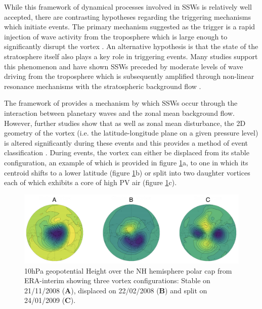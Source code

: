 While this framework of dynamical processes involved in SSWs is relatively well accepted, there are contrasting hypotheses regarding the triggering mechanisms which initiate events. The primary mechanism suggested as the trigger is a rapid injection of wave activity from the troposphere which is large enough to significantly disrupt the vortex \citep{matsunoDynamical1971b, limpasuvanLife2004b, manneyAura2009b, nishiiModulations2009b, kuttippurathComparative2012b}. An alternative hypothesis is that the state of the stratosphere itself also plays a key role in triggering events. Many studies support this phenomenon and have shown SSWs preceded by moderate levels of wave driving from the troposphere which is subsequently amplified through non-linear resonance mechanisms with the stratospheric background flow \citep{eslerExcitation2005b, scottInternal2006b, eslerStratospheric2011a}.

The framework of \cite{matsunoDynamical1971b} provides a mechanism by which SSWs occur through the interaction between planetary waves and the zonal mean background flow. However, further studies show that as well as zonal mean disturbance, the 2D geometry of the vortex (i.e. the latitude-longitude plane on a given pressure level) is altered significantly during these events and this provides a method of event classification \citep{lehtonenObserved2016b, Mitchell2011a, Seviour2013}. During events, the vortex can either be displaced from its stable configuration, an example of which is provided in figure \ref{fig:GPH_schematic}a, to one in which its centroid shifts to a lower latitude (figure \ref{fig:GPH_schematic}b) or split into two daughter vortices each of which exhibits a core of high PV air (figure \ref{fig:GPH_schematic}c). 
\begin{figure}[h!]
\centering
\includegraphics[width= \linewidth]{Figures/Figures-background/GPH_schematic.png}
\caption{10hPa geopotential Height over the NH hemisphere polar cap from ERA-interim showing three vortex configurations: Stable on 21/11/2008 (\textbf{A}), displaced on 22/02/2008 (\textbf{B}) and split on 24/01/2009 (\textbf{C}).}
\centering
\label{fig:GPH_schematic}
\end{figure}

